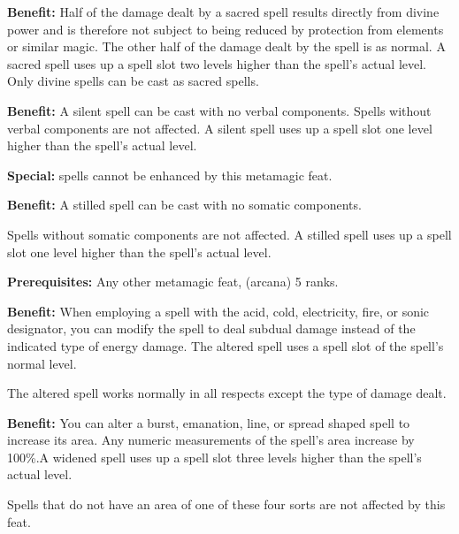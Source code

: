 
\textbf{Benefit:} Half of the damage dealt by a sacred spell results directly from divine power and is therefore not subject to being reduced by protection from elements or similar magic. The other half of the damage dealt by the spell is as normal. A sacred spell uses up a spell slot two levels higher than the spell's actual level. Only divine spells can be cast as sacred spells.


\textbf{Benefit:} A silent spell can be cast with no verbal components. Spells without verbal components are not affected. A silent spell uses up a spell slot one level higher than the spell's actual level.

\textbf{Special:}  spells cannot be enhanced by this metamagic feat.


\textbf{Benefit:} A stilled spell can be cast with no somatic components.

Spells without somatic components are not affected. A stilled spell uses up a spell slot one level higher than the spell's actual level.


\textbf{Prerequisites:} Any other metamagic feat,  (arcana) 5 ranks.

\textbf{Benefit:} When employing a spell with the acid, cold, electricity, fire, or sonic designator, you can modify the spell to deal subdual damage instead of the indicated type of energy damage. The altered spell uses a spell slot of the spell's normal level.

The altered spell works normally in all respects except the type of damage dealt.


\textbf{Benefit:} You can alter a burst, emanation, line, or spread shaped spell to increase its area. Any numeric measurements of the spell's area increase by 100\%.A widened spell uses up a spell slot three levels higher than the spell's actual level.

Spells that do not have an area of one of these four sorts are not affected by this feat.
